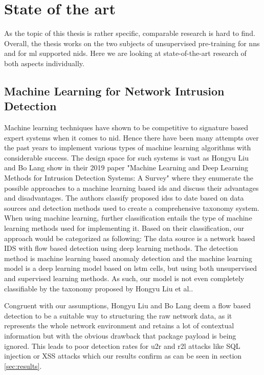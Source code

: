 \chapter{State of the art} \label{sec:stateofart}

As the topic of this thesis is rather specific, comparable research is hard to find. Overall, the thesis works on the two subjects of unsupervised pre-training for \glspl{nn} and for \gls{ml} supported \gls{nids}. Here we are looking at state-of-the-art research of both aspects individually.

\section{Machine Learning for Network Intrusion Detection}

Machine learning techniques have shown to be competitive to signature based expert systems when it comes to \gls{nid}. Hence there have been many attempts over the past years to implement various types of machine learning algorithms with considerable success. The design space for such systems is vast as Hongyu Liu and Bo Lang show in their 2019 paper \cite{nid_ml_survey_2019} "Machine Learning and Deep Learning Methods for Intrusion Detection Systems: A Survey" where they enumerate the possible approaches to a machine learning based \gls{ids} and discuss their advantages and disadvantages. The authors classify proposed \glspl{ids} to date based on data sources and detection methods used to create a comprehensive taxonomy system. When using machine learning, further classification entails the type of machine learning methods used for implementing it. Based on their classification, our approach would be categorized as following: The data source is a network based IDS with flow based detection using deep learning methods. The detection method is machine learning based anomaly detection and the machine learning model is a deep learning model based on \gls{lstm} cells, but using both unsupervised and supervised learning methods. As such, our model is not even completely classifiable by the taxonomy proposed by Hongyu Liu et al.. \par


Congruent with our assumptions, Hongyu Liu and Bo Lang deem a flow based detection to be a suitable way to structuring the raw network data, as it represents the whole network environment and retains a lot of contextual information but with the obvious drawback that package payload is being ignored. This leads to poor detection rates for \gls{u2r} and \gls{r2l} attacks like SQL injection or XSS attacks which our results confirm as can be seen in section \ref{sec:results}. \par

